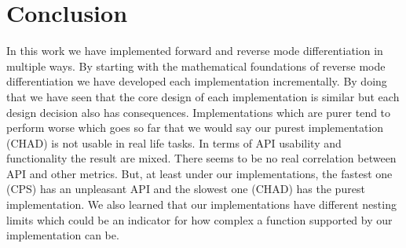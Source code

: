 \chapter{Conclusion}
In this work we have implemented forward and reverse mode differentiation in multiple ways. By starting with the mathematical foundations of reverse mode differentiation we have developed each implementation incrementally. By doing that we have seen that the core design of each implementation is similar but each design decision also has consequences. Implementations which are purer tend to perform worse which goes so far that we would say our purest implementation (CHAD) is not usable in real life tasks. In terms of API usability and functionality the result are mixed. There seems to be no real correlation between API and other metrics. But, at least under our implementations, the fastest one (CPS) has an unpleasant API and the slowest one (CHAD) has the purest implementation. We also learned that our implementations have different nesting limits which could be an indicator for how complex a function supported by our implementation can be.